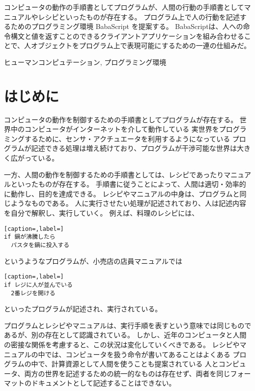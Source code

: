 \documentclass{deimj}
\begin{document}
\pagestyle{empty}
\begin{jabstract}
コンピュータの動作の手順書としてプログラムが、人間の行動の手順書としてマニュアルやレシピといったものが存在する。
プログラム上で人の行動を記述するためのプログラミング環境 BabaScript を提案する。
BabaScriptは、人への命令構文と値を返すことのできるクライアントアプリケーションを組み合わせることで、人オブジェクトをプログラム上で表現可能にするための一連の仕組みだ。

\end{jabstract}
\begin{jkeyword}
ヒューマンコンピュテーション, プログラミング環境
\end{jkeyword}
\maketitle

\section{はじめに}

コンピュータの動作を制御するための手順書としてプログラムが存在する。
世界中のコンピュータがインターネットを介して動作している
実世界をプログラミングするために、センサ・アクチュエータを利用するようになっている
プログラムが記述できる処理は増え続けており、プログラムが干渉可能な世界は大きく広がっている。

一方、人間の動作を制御するための手順書としては、レシピであったりマニュアルといったものが存在する。
手順書に従うことによって、人間は適切・効率的に動作し、目的を達成できる。
レシピやマニュアルの中身は、プログラムと同じようなものである。
人に実行させたい処理が記述されており、人は記述内容を自分で解釈し、実行していく。
例えば、料理のレシピには、

\begin{lstlisting}[caption=,label=]
if 鍋が沸騰したら
  パスタを鍋に投入する
\end{lstlisting}
    
というようなプログラムが、小売店の店員マニュアルでは

\begin{lstlisting}[caption=,label=]
if レジに人が並んでいる
  2番レジを開ける
\end{lstlisting}
    
といったプログラムが記述され、実行されている。

プログラムとレシピやマニュアルは、実行手順を表すという意味では同じものであるが、別の存在として認識されている。
しかし、近年のコンピュータと人間の密接な関係を考慮すると、この状況は変化していくべきである。
レシピやマニュアルの中では、コンピュータを扱う命令が書いてあることはよくある
プログラムの中で、計算資源として人間を使うことも提案されている
人とコンピュータ、両方の世界を記述するための統一的なものは存在せず、両者を同じフォーマットのドキュメントとして記述することはできない。
\end{document}
